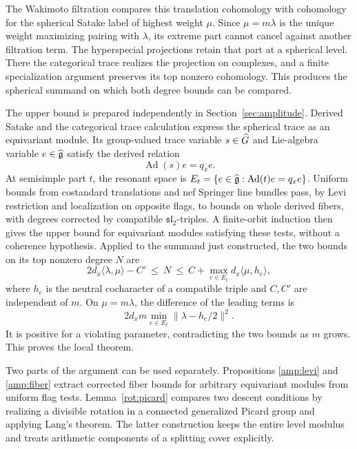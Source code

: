 The Wakimoto filtration compares this translation cohomology with
cohomology for the spherical Satake label of highest weight \(\mu\).
Since \(\mu=m\lambda\) is the unique weight maximizing pairing
with \(\lambda\), its extreme part cannot cancel against another
filtration term. The hyperspecial projections retain that part at a
spherical level. There the categorical trace realizes the projection
on complexes, and a finite specialization argument preserves its top
nonzero cohomology. This produces the spherical summand on which both
degree bounds can be compared.

The upper bound is prepared independently in
Section~\ref{sec:amplitude}. Derived Satake and the categorical trace
calculation express the spherical trace as an equivariant module.
Its group-valued trace variable \(s\in\widehat G\) and Lie-algebra variable
\(e\in\widehat{\mathfrak g}\) satisfy the derived relation
\begin{equation}\label{intro:resonance}
 \operatorname{Ad}(s)e=q_xe.
\end{equation}
At semisimple part \(t\), the resonant space is
\(E_t=\{e\in\widehat{\mathfrak g}:\operatorname{Ad}(t)e=q_xe\}\).
Uniform bounds from costandard translations and nef Springer line
bundles pass, by Levi restriction and localization on opposite flags,
to bounds on whole derived fibers, with degrees corrected by compatible
\(\mathfrak{sl}_2\)-triples. A finite-orbit induction then
gives the upper bound for equivariant modules satisfying these tests,
without a coherence hypothesis. Applied to the summand just constructed, the two
bounds on its top nonzero degree \(N\) are
\[
 2d_x\langle\lambda,\mu\rangle-C'
 \ \leq\ N\ \leq\
 C+\max_{e\in E_t}d_x\langle\mu,h_e\rangle,
\]
where \(h_e\) is the neutral cocharacter of a compatible triple and
\(C,C'\) are independent of \(m\). On \(\mu=m\lambda\), the
difference of the leading terms is
\[
 2d_xm\min_{e\in E_t}\|\lambda-h_e/2\|^2.
\]
It is positive for a violating parameter, contradicting the two
bounds as \(m\) grows. This proves the local theorem.

Two parts of the argument can be used separately. Propositions
\ref{amp:levi} and \ref{amp:fiber} extract corrected fiber bounds for
arbitrary equivariant modules from uniform flag tests.
Lemma~\ref{rot:picard} compares two descent conditions
by realizing a divisible rotation in a connected generalized Picard
group and applying Lang's theorem. The latter construction keeps the
entire level modulus and treats arithmetic components of a splitting
cover explicitly.

